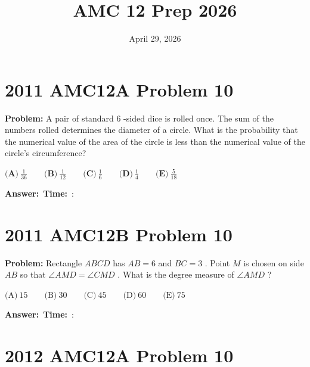 \documentclass[12pt]{article}
\title{AMC 12 Prep 2026}
\author{}
\date{April 29, 2026}
\begin{document}
\maketitle

\section{2011 AMC12A Problem 10}

\textbf{Problem:}
A pair of standard $6$ -sided dice is rolled once. The sum of the numbers rolled determines the diameter of a circle. What is the probability that the numerical value of the area of the circle is less than the numerical value of the circle's circumference?

$\textbf{(A)}\ \frac{1}{36} \qquad \textbf{(B)}\ \frac{1}{12} \qquad \textbf{(C)}\ \frac{1}{6} \qquad \textbf{(D)}\ \frac{1}{4} \qquad \textbf{(E)}\ \frac{5}{18}$

\vspace{0.3cm}
\noindent\textbf{Answer:}~\underline{\hspace{5cm}}\hfill\textbf{Time:}~\underline{\hspace{1.2cm}}:\underline{\hspace{1.2cm}}

\vspace{0.5cm}

\section{2011 AMC12B Problem 10}

\textbf{Problem:}
Rectangle $ABCD$ has $AB=6$ and $BC=3$ . Point $M$ is chosen on side $AB$ so that $\angle AMD=\angle CMD$ . What is the degree measure of $\angle AMD$ ?

$\textrm{(A)}\ 15 \qquad \textrm{(B)}\ 30 \qquad \textrm{(C)}\ 45 \qquad \textrm{(D)}\ 60 \qquad \textrm{(E)}\ 75$

\vspace{0.3cm}
\noindent\textbf{Answer:}~\underline{\hspace{5cm}}\hfill\textbf{Time:}~\underline{\hspace{1.2cm}}:\underline{\hspace{1.2cm}}

\vspace{0.5cm}

\section{2012 AMC12A Problem 10}
\end{document}
